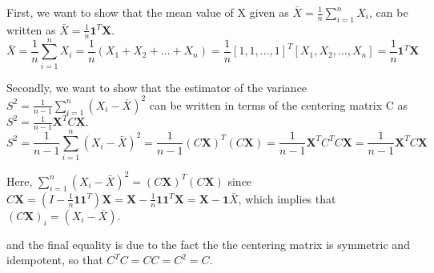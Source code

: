 First, we want to show that the mean value of X given as $\bar X = \frac{1}{n} \sum_{i=1}^{n} X_i$, can be written as $\bar X = \frac{1}{n} \textbf{1}^T \textbf{X}$. 
$$
\bar X = \frac{1}{n} \sum_{i=1}^{n} X_i = \frac{1}{n} (X_1 + X_2 + ... + X_n) = \frac{1}{n} [1, 1, ..., 1]^T [X_1, X_2, ..., X_n]= \frac{1}{n} \textbf{1}^T \textbf{X}
$$

Secondly, we want to show that the estimator of the variance $S^2 = \frac{1}{n-1}  \sum_{i=1}^{n} (X_i - \bar X)^2$ can be written in terms of the centering matrix C as  $S^2 = \frac{1}{n-1} \textbf{X}^T C \textbf{X}.$
$$
S^2 = \frac{1}{n-1}  \sum_{i=1}^{n} (X_i - \bar X)^2 = \frac{1}{n-1} (C\textbf{X})^T (C\textbf{X}) = \frac{1}{n-1} \textbf{X}^T C^T C \textbf{X} =  \frac{1}{n-1} \textbf{X}^T C \textbf{X}
$$

Here, $\sum_{i=1}^{n} (X_i - \bar X)^2 = (C\textbf{X})^T (C\textbf{X})$ since $C\textbf{X} = \left(I-\frac{1}{n}\boldsymbol{1}\boldsymbol{1}^T\right)\textbf{X} = \textbf{X}-\frac{1}{n}\boldsymbol{1}\boldsymbol{1}^T\textbf{X} = \textbf{X}-\boldsymbol{1}\bar{X}$, which implies that $\left(C\textbf{X}\right)_i = (X_i - \bar{X}).$

and the final equality is due to the fact the the centering matrix is symmetric and idempotent, so that $C^T C = CC = C^2 = C$.  


